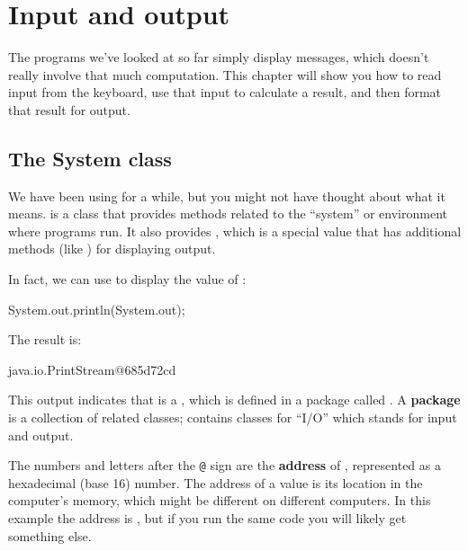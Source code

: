 \chapter{Input and output}

The programs we've looked at so far simply display messages, which doesn't really involve that much computation.
This chapter will show you how to read input from the keyboard, use that input to calculate a result, and then format that result for output.


\section{The System class}
\label{sec:system}


We have been using  for a while, but you might not have thought about what it means.
 is a class that provides methods related to the ``system'' or environment where programs run.
It also provides , which is a special value that has additional methods (like ) for displaying output.


In fact, we can use  to display the value of :

\begin{code}
System.out.println(System.out);
\end{code}

The result is:

\begin{stdout}
java.io.PrintStream@685d72cd
\end{stdout}


This output indicates that  is a , which is defined in a package called .
A {\bf package} is a collection of related classes;  contains classes for ``I/O'' which stands for input and output.


The numbers and letters after the {\tt @} sign are the {\bf address} of , represented as a hexadecimal (base 16) number.
The address of a value is its location in the computer's memory, which might be different on different computers.
In this example the address is , but if you run the same code you will likely get something else.

